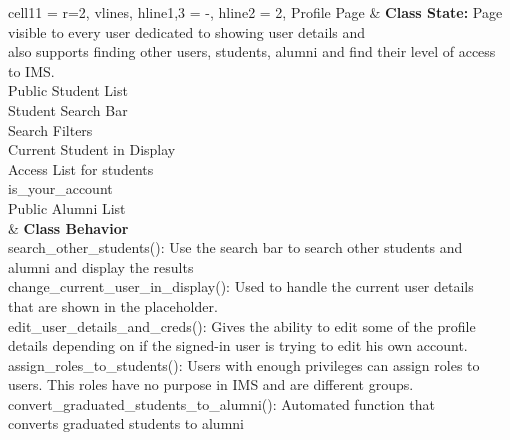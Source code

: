 \documentclass[11pt]{article}
\begin{document}
\begin{longtblr}[
  label = none,
  entry = none,
]{
  cell{1}{1} = {r=2}{},
  vlines,
  hline{1,3} = {-}{},
  hline{2} = {2}{},
}
Profile Page & {\textbf{Class State: }Page visible to every user dedicated to showing user details and \\
also supports finding other users, students, alumni and find their level of access \\to IMS. \\
\hspace{\dimexpr\labelsep+0.5\tabcolsep}Public Student List\\
\hspace{\dimexpr\labelsep+0.5\tabcolsep}Student Search Bar\\
\hspace{\dimexpr\labelsep+0.5\tabcolsep}Search Filters\\
\hspace{\dimexpr\labelsep+0.5\tabcolsep}Current Student in Display\\
\hspace{\dimexpr\labelsep+0.5\tabcolsep}Access List for students\\
\hspace{\dimexpr\labelsep+0.5\tabcolsep}is\_your\_account\\
\hspace{\dimexpr\labelsep+0.5\tabcolsep}Public Alumni List} \\
             & {\textbf{Class Behavior}\\
\hspace{\dimexpr\labelsep+0.5\tabcolsep}search\_other\_students(): Use the search bar to search
other students and \\ alumni and display the results\\
\hspace{\dimexpr\labelsep+0.5\tabcolsep}change\_current\_user\_in\_display(): Used to handle the
current user details \\that are shown in the placeholder.\\
\hspace{\dimexpr\labelsep+0.5\tabcolsep}edit\_user\_details\_and\_creds(): Gives the
ability to edit some of the profile \\details depending on if the signed-in user is trying to edit his own account.\\
\hspace{\dimexpr\labelsep+0.5\tabcolsep}assign\_roles\_to\_students(): Users with enough privileges can
assign roles to \\users. This roles have no purpose in IMS and are different groups.\\
\hspace{\dimexpr\labelsep+0.5\tabcolsep}convert\_graduated\_students\_to\_alumni(): Automated function that\\
converts graduated students to alumni}
\end{longtblr}
\end{document}
